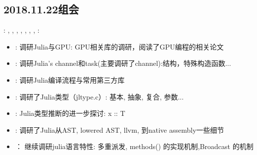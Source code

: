 \subsection{2018.11.22组会}
\label{sec:g2018:1019}
: \ZY, \ZhangLF, \CaiWT, \DongH, \HeLY, \YuCD, \DaiL, \HeJY
\newline
{}:\CaiWT
\newline

\begin{itemize}
\item \DaiL:
调研Julia与GPU: GPU相关库的调研，阅读了GPU编程的相关论文

\item \ZhangLF:
调研Julia's channel和task(主要调研了channel):结构，特殊构造函数...

\item \DongH:
调研Julia编译流程与常用第三方库

\item \YuCD:
调研了Julia类型（jltype.c）: 基本, 抽象, 复合, 参数... 

\item \HeLY:
Julia类型推断的进一步探讨: x :: T

\item \CaiWT:
调研了Julia从AST, lowered AST, llvm, 到native assembly一些细节

\item \HeJY：
继续调研julia语言特性: 多重派发, methods() 的实现机制,Broadcast 的机制

\end{itemize}


